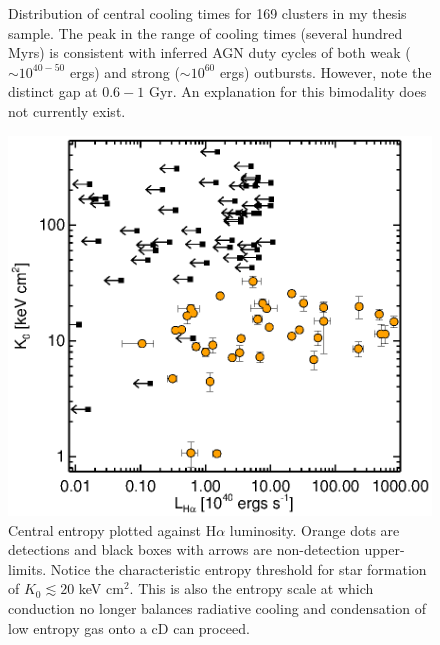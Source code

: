 \documentclass[11pt]{article}
\begin{document}
\begin{figure}[t]
\begin{minipage}[t]{0.5\linewidth}
        \caption{\small Distribution of central cooling times for 169
	clusters in my thesis sample. The peak in the range of cooling
	times (several hundred Myrs) is consistent with inferred AGN
	duty cycles of both weak ($\sim 10^{40-50}$ ergs) and strong ($\sim
	10^{60}$ ergs) outbursts. However, note the distinct gap at $0.6-1$
	Gyr. An explanation for this bimodality does not currently exist.}
	\label{fig:tcool}
    \end{minipage}
    \hspace{0.1cm}
    \begin{minipage}[t]{0.5\linewidth}
        \centering
        \includegraphics*[width=\textwidth, trim=28mm 8mm 30mm 10mm, clip]{ha}
        \caption{\small Central entropy plotted against H$\alpha$
	luminosity. Orange dots are detections and black boxes with
	arrows are non-detection upper-limits. Notice the characteristic entropy threshold for star
	formation of $K_0 \lesssim 20$ keV cm$^2$. This is also the entropy scale at
	which conduction no longer balances radiative cooling and condensation
	of low entropy gas onto a cD can proceed.}
        \label{fig:ha}
    \end{minipage}
    \hspace{0.1in}
    \begin{minipage}[t]{0.5\linewidth}
        \centering

\end{minipage}
\end{figure}
\end{document}
